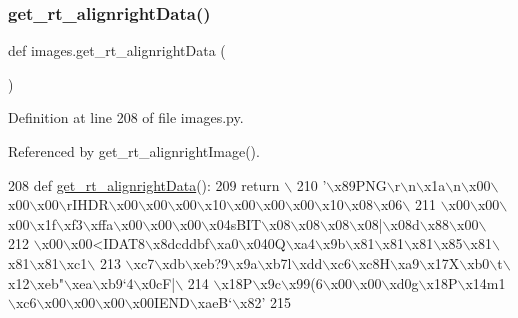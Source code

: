 \subsubsection{\texorpdfstring{get\+\_\+rt\+\_\+alignright\+Data()}{get\_rt\_alignrightData()}}
{\footnotesize\ttfamily def images.\+get\+\_\+rt\+\_\+alignright\+Data (\begin{DoxyParamCaption}{ }\end{DoxyParamCaption})}



Definition at line 208 of file images.\+py.



Referenced by get\+\_\+rt\+\_\+alignright\+Image().


\begin{DoxyCode}
208 \textcolor{keyword}{def }\hyperlink{namespaceimages_acf000e07da367236ad5320674525c7a5}{get\_rt\_alignrightData}():
209     \textcolor{keywordflow}{return} \(\backslash\)
210 \textcolor{stringliteral}{'\(\backslash\)x89PNG\(\backslash\)r\(\backslash\)n\(\backslash\)x1a\(\backslash\)n\(\backslash\)x00\(\backslash\)x00\(\backslash\)x00\(\backslash\)rIHDR\(\backslash\)x00\(\backslash\)x00\(\backslash\)x00\(\backslash\)x10\(\backslash\)x00\(\backslash\)x00\(\backslash\)x00\(\backslash\)x10\(\backslash\)x08\(\backslash\)x06\(\backslash\)}
211 \textcolor{stringliteral}{\(\backslash\)x00\(\backslash\)x00\(\backslash\)x00\(\backslash\)x1f\(\backslash\)xf3\(\backslash\)xffa\(\backslash\)x00\(\backslash\)x00\(\backslash\)x00\(\backslash\)x04sBIT\(\backslash\)x08\(\backslash\)x08\(\backslash\)x08\(\backslash\)x08|\(\backslash\)x08d\(\backslash\)x88\(\backslash\)x00\(\backslash\)}
212 \textcolor{stringliteral}{\(\backslash\)x00\(\backslash\)x00<IDAT8\(\backslash\)x8dcddbf\(\backslash\)xa0\(\backslash\)x040Q\(\backslash\)xa4\(\backslash\)x9b\(\backslash\)x81\(\backslash\)x81\(\backslash\)x81\(\backslash\)x85\(\backslash\)x81\(\backslash\)x81\(\backslash\)x81\(\backslash\)xc1\(\backslash\)}
213 \textcolor{stringliteral}{\(\backslash\)xc7\(\backslash\)xdb\(\backslash\)xeb?9\(\backslash\)x9a\(\backslash\)xb7l\(\backslash\)xdd\(\backslash\)xc6\(\backslash\)xc8H\(\backslash\)xa9\(\backslash\)x17X\(\backslash\)xb0\(\backslash\)t\(\backslash\)x12\(\backslash\)xeb"\(\backslash\)xea\(\backslash\)xb9`4\(\backslash\)x0cF|\(\backslash\)}
214 \textcolor{stringliteral}{\(\backslash\)x18P\(\backslash\)x9c\(\backslash\)x99(6\(\backslash\)x00\(\backslash\)x00\(\backslash\)xd0g\(\backslash\)x18P\(\backslash\)x14m1\(\backslash\)xc6\(\backslash\)x00\(\backslash\)x00\(\backslash\)x00\(\backslash\)x00IEND\(\backslash\)xaeB`\(\backslash\)x82'}
215 
\end{DoxyCode}
\mbox{\label{namespaceimages_a30f98db321746be49e7494a4468df4ea}} 
